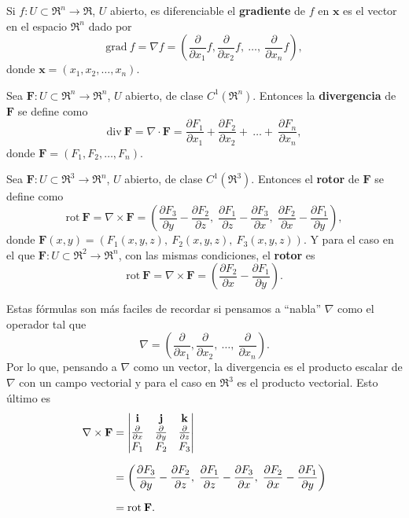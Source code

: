 \begin{definition}
    Si $f:U\subset\Re^n\to\Re$, $U$ abierto, es diferenciable el \textbf{gradiente} de $f$ en $\mathbf{x}$ es el vector en el espacio $\Re^n$ dado por 
    \[
        \text{grad}\:f=\nabla f=(\frac{\partial}{\partial x_1} f,\frac{\partial}{\partial x_2} f,\:\ldots,\: \frac{\partial}{\partial x_n} f),
    \]
    donde $\mathbf{x}=(x_1, x_2,\ldots, x_n)$.
\end{definition}
\begin{definition}
    Sea $\mathbf{F}:U\subset\Re^n\to\Re^n$, $U$ abierto, de clase $C^1(\Re^n)$. Entonces la \textbf{divergencia} de $\mathbf{F}$ se define como
    \[
        \text{div}\:\mathbf{F}=\nabla\cdot \mathbf{F}=  \frac{\partial F_1}{\partial x_1}+\frac{\partial F_2}{\partial x_2}+\:\ldots+\: \frac{\partial F_n}{\partial x_n},
    \]
    donde $\mathbf{F}=(F_1,F_2,\ldots,F_n)$.
\end{definition}
\begin{definition}
    Sea $\mathbf{F}:U\subset\Re^3\to\Re^n$, $U$ abierto, de clase $C^1(\Re^3)$. Entonces el \textbf{rotor} de $\mathbf{F}$ se define como 
    \[
        \text{rot}\:\mathbf{F}=\nabla\times\mathbf{F}=\left(\frac{\partial F_3}{\partial y}-\frac{\partial F_2}{\partial z},\;\frac{\partial F_1}{\partial z}-\frac{\partial F_3}{\partial x},\;\frac{\partial F_2}{\partial x}-\frac{\partial F_1}{\partial y}\right),
    \]   
    donde $\mathbf{F}(x,y)=(F_1(x,y,z),\:F_2(x,y,z),\:F_3(x,y,z))$.
    Y para el caso en el que $\mathbf{F}:U\subset\Re^2\to\Re^n$, con las mismas condiciones, el \textbf{rotor} es
    \[
        \text{rot}\:\mathbf{F}=\nabla\times\mathbf{F}=\left(\frac{\partial F_2}{\partial x}-\frac{\partial F_1}{\partial y}\right).
    \]
\end{definition}
    Estas f\'ormulas son m\'as faciles de recordar si pensamos a ``nabla'' $\nabla$ como el operador tal que 
    \[
        \nabla = (\frac{\partial}{\partial x_1},\frac{\partial}{\partial x_2},\:\ldots,\: \frac{\partial}{\partial x_n}).  
    \]
    Por lo que, pensando a $\nabla$ como un vector, la divergencia es el producto escalar de $\nabla$ con un campo vectorial y para el caso en $\Re^3$ es el producto vectorial. Esto \'ultimo es
    \begin{align*}
        \nabla\times\mathbf{F}&= 
        \begin{vmatrix}
        \mathbf{i} & \mathbf{j} & \mathbf{k} \\
        \frac{\partial}{\partial x} & \frac{\partial}{\partial y} & \frac{\partial}{\partial z} \\
        F_1 & F_2 & F_3
        \end{vmatrix} \\[.2cm]
        &=\left(\frac{\partial F_3}{\partial y}-\frac{\partial F_2}{\partial z},\;\frac{\partial F_1}{\partial z}-\frac{\partial F_3}{\partial x},\;\frac{\partial F_2}{\partial x}-\frac{\partial F_1}{\partial y}\right)\\[.2cm]
        &=\text{rot}\:\mathbf{F}.
    \end{align*}

